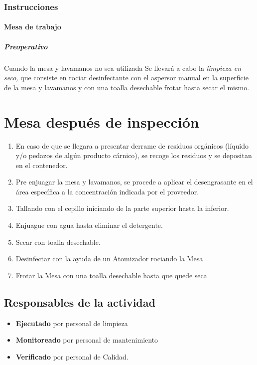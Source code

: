 \subsubsection{Instrucciones}
\paragraph{Mesa de trabajo}
\subparagraph{Preoperativo}
Cuando la mesa y lavamanos no sea utilizada Se llevará a cabo la \emph{limpieza en seco,} que consiste en rociar desinfectante con el aspersor manual en la superficie de la mesa y lavamanos y con una toalla desechable frotar hasta secar el mismo.

\section{Mesa después de inspección}

\begin{enumerate}
	\item En caso de que se llegara a presentar derrame de residuos orgánicos (líquido y/o pedazos de algún producto cárnico), se recoge los residuos y se depositan en el contenedor.
	\item Pre enjuagar la mesa y lavamanos, se procede a aplicar el desengrasante en el área específica a la concentración indicada por el proveedor.
	\item Tallando con el cepillo iniciando de la parte superior hasta la inferior.
	\item Enjuague con agua hasta eliminar el detergente.
	\item Secar con toalla desechable.
	\item Desinfectar con la ayuda de un Atomizador rociando la Mesa
	\item Frotar la Mesa con una toalla desechable hasta que quede seca
\end{enumerate}

\subsection{Responsables de la actividad}

\begin{itemize}
	\item \textbf{Ejecutado} por personal de limpieza
	\item \textbf{Monitoreado} por personal de mantenimiento
	\item \textbf{Verificado} por personal de Calidad.
\end{itemize}

